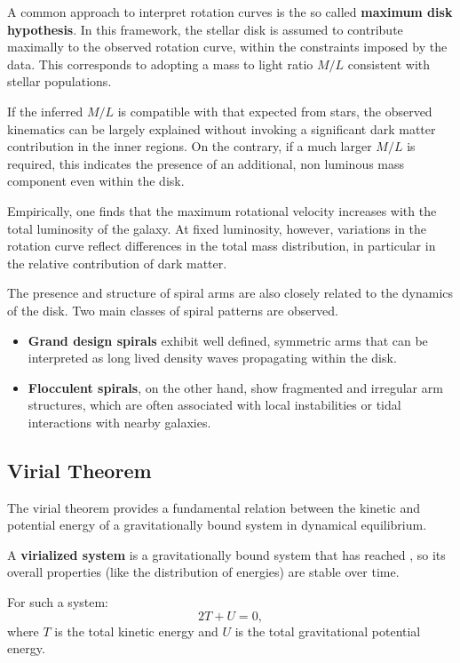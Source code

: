 \medskip

A common approach to interpret rotation curves is the so called \textbf{maximum disk hypothesis}. In this framework, the stellar disk is assumed to contribute maximally to the observed rotation curve, within the constraints imposed by the data. This corresponds to adopting a mass to light ratio $M/L$ consistent with stellar populations.

If the inferred $M/L$ is compatible with that expected from stars, the observed kinematics can be largely explained without invoking a significant dark matter contribution in the inner regions. On the contrary, if a much larger $M/L$ is required, this indicates the presence of an additional, non luminous mass component even within the disk.

Empirically, one finds that the maximum rotational velocity increases with the total luminosity of the galaxy. At fixed luminosity, however, variations in the rotation curve reflect differences in the total mass distribution, in particular in the relative contribution of dark matter.

The presence and structure of spiral arms are also closely related to the dynamics of the disk. Two main classes of spiral patterns are observed. 

\begin{itemize}
\item \textbf{Grand design spirals} exhibit well defined, symmetric arms that can be interpreted as long lived density waves propagating within the disk. 

\item \textbf{Flocculent spirals}, on the other hand, show fragmented and irregular arm structures, which are often associated with local instabilities or tidal interactions with nearby galaxies.
\end{itemize}

\subsection{Virial Theorem}

The virial theorem provides a fundamental relation between the kinetic and potential energy of a gravitationally bound system in dynamical equilibrium.

\begin{definitionblock}

A \textbf{virialized system} is a gravitationally bound system that has reached , so its overall properties (like the distribution of energies) are stable over time.

For such a system:
$$
2T + U = 0,
$$
where $T$ is the total kinetic energy and $U$ is the total gravitational potential energy.

\end{definitionblock}

